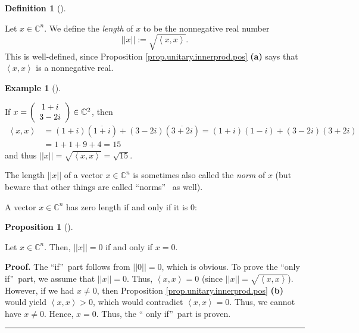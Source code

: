 \documentclass[numbers=enddot,12pt,final,onecolumn,notitlepage]{scrartcl}%
\numberwithin{exer}{subsection}
\theoremstyle{definition}
\newtheorem{prop}[theo]{Proposition}
\newenvironment{proposition}[1][]
{\begin{prop}[#1]\begin{leftbar}}
{\end{leftbar}\end{prop}}
\newtheorem{defi}[theo]{Definition}
\newenvironment{definition}[1][]
{\begin{defi}[#1]\begin{leftbar}}
{\end{leftbar}\end{defi}}
\newtheorem{exam}[theo]{Example}
\newenvironment{example}[1][]
{\begin{exam}[#1]\begin{leftbar}}
{\end{leftbar}\end{exam}}
\newenvironment{proof}[1][Proof]{\noindent\textbf{#1.} }{\ \rule{0.5em}{0.5em}}
\begin{document}
\begin{definition}
\label{def.unitary.innerprod.len}Let $x\in\mathbb{C}^{n}$. We define the
\emph{length} of $x$ to be the nonnegative real number
\[
\left\vert \left\vert x\right\vert \right\vert :=\sqrt{\left\langle
x,x\right\rangle }.
\]
This is well-defined, since Proposition \ref{prop.unitary.innerprod.pos}
\textbf{(a)} says that $\left\langle x,x\right\rangle $ is a nonnegative real.
\end{definition}

\begin{example}
If $x=\left(
\begin{array}
[c]{c}%
1+i\\
3-2i
\end{array}
\right)  \in\mathbb{C}^{2}$, then%
\begin{align*}
\left\langle x,x\right\rangle  &  =\left(  1+i\right)  \left(  \overline
{1+i}\right)  +\left(  3-2i\right)  \left(  \overline{3+2i}\right)  =\left(
1+i\right)  \left(  1-i\right)  +\left(  3-2i\right)  \left(  3+2i\right) \\
&  =1+1+9+4=15
\end{align*}
and thus $\left\vert \left\vert x\right\vert \right\vert =\sqrt{\left\langle
x,x\right\rangle }=\sqrt{15}$.
\end{example}

The length $\left\vert \left\vert x\right\vert \right\vert $ of a vector
$x\in\mathbb{C}^{n}$ is sometimes also called the \emph{norm} of $x$ (but
beware that other things are called \textquotedblleft norms\textquotedblright%
\ as well).

A vector $x\in\mathbb{C}^{n}$ has zero length if and only if it is $0$:

\begin{proposition}
Let $x\in\mathbb{C}^{n}$. Then, $\left\vert \left\vert x\right\vert
\right\vert =0$ if and only if $x=0$.
\end{proposition}

\begin{proof}
The \textquotedblleft if\textquotedblright\ part follows from $\left\vert
\left\vert 0\right\vert \right\vert =0$, which is obvious. To prove the
\textquotedblleft only if\textquotedblright\ part, we assume that $\left\vert
\left\vert x\right\vert \right\vert =0$. Thus, $\left\langle x,x\right\rangle
=0$ (since $\left\vert \left\vert x\right\vert \right\vert =\sqrt{\left\langle
x,x\right\rangle }$). However, if we had $x\neq0$, then Proposition
\ref{prop.unitary.innerprod.pos} \textbf{(b)} would yield $\left\langle
x,x\right\rangle >0$, which would contradict $\left\langle x,x\right\rangle
=0$. Thus, we cannot have $x\neq0$. Hence, $x=0$. Thus, the \textquotedblleft
only if\textquotedblright\ part is proven.
\end{proof}
\end{document}
